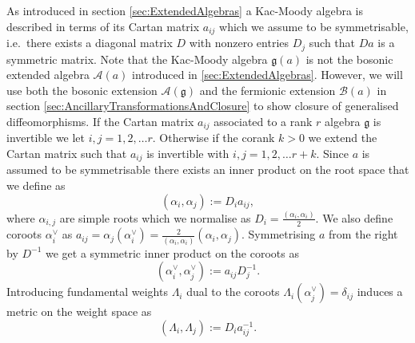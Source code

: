 As introduced in section \ref{sec:ExtendedAlgebras} a Kac-Moody algebra is described in terms of its Cartan matrix $a_{ij}$ which we assume to be symmetrisable, i.e.\ there exists a diagonal matrix $D$ with nonzero entries $D_j$ such that $Da$ is a symmetric matrix. Note that the Kac-Moody algebra $\mathfrak{g}(a)$ is not the bosonic extended algebra $\mathscr{A}(a)$ introduced in \ref{sec:ExtendedAlgebras}. However, we will use both the bosonic extension $\mathscr{A}(\mathfrak{g})$ and the fermionic extension $\mathscr{B}(a)$ in section \ref{sec:AncillaryTransformationsAndClosure} to show closure of generalised diffeomorphisms. If the Cartan matrix $a_{ij}$ associated to a rank $r$ algebra $\mathfrak{g}$ is invertible we let $i,j=1,2,\ldots r$. Otherwise if the corank $k>0$ we extend the Cartan matrix such that $a_{ij}$ is invertible with $i,j=1,2,\ldots r+k$. Since $a$ is assumed to be symmetrisable there exists an inner product on the root space that we define as 
\begin{equation}
    (\alpha_i,\alpha_j) := D_ia_{ij},
\end{equation}
where $\alpha_{i,j}$ are simple roots which we normalise as $D_i=\frac{(\alpha_i,\alpha_i)}{2}$. We also define coroots $\alpha_i^\vee$ as $a_{ij} =\alpha_j(\alpha_i^\vee) = \frac{2}{(\alpha_i,\alpha_i)}(\alpha_i,\alpha_j)$. Symmetrising $a$ from the right by $D^{-1}$ we get a symmetric inner product on the coroots as 
\begin{equation}
    (\alpha_i^\vee,\alpha_j^\vee) := a_{ij}D^{-1}_j. 
\end{equation}
Introducing fundamental weights $\Lambda_i$ dual to the coroots $\Lambda_i(\alpha_j^\vee)=\delta_{ij}$ induces a metric on the weight space as 
\begin{equation}
    (\Lambda_i,\Lambda_j) := D_ia^{-1}_{ij}.
\end{equation}


